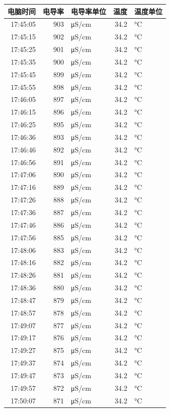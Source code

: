 \documentclass[11pt]{article}
\begin{document}
\begin{enumerate}
\begin{center}
\begin{tabular}{rrlrl}
电脑时间 & 电导率 & 电导率单位 & 温度 & 温度单位\\
\hline
17:45:05 & 903 & μS/cm & 34.2 & °C\\
17:45:15 & 902 & μS/cm & 34.2 & °C\\
17:45:25 & 901 & μS/cm & 34.2 & °C\\
17:45:35 & 900 & μS/cm & 34.2 & °C\\
17:45:45 & 899 & μS/cm & 34.2 & °C\\
17:45:55 & 898 & μS/cm & 34.2 & °C\\
17:46:05 & 897 & μS/cm & 34.2 & °C\\
17:46:15 & 896 & μS/cm & 34.2 & °C\\
17:46:25 & 895 & μS/cm & 34.2 & °C\\
17:46:36 & 893 & μS/cm & 34.2 & °C\\
17:46:46 & 892 & μS/cm & 34.2 & °C\\
17:46:56 & 891 & μS/cm & 34.2 & °C\\
17:47:06 & 890 & μS/cm & 34.2 & °C\\
17:47:16 & 889 & μS/cm & 34.2 & °C\\
17:47:26 & 888 & μS/cm & 34.2 & °C\\
17:47:36 & 887 & μS/cm & 34.2 & °C\\
17:47:46 & 886 & μS/cm & 34.2 & °C\\
17:47:56 & 885 & μS/cm & 34.2 & °C\\
17:48:06 & 883 & μS/cm & 34.2 & °C\\
17:48:16 & 882 & μS/cm & 34.2 & °C\\
17:48:26 & 881 & μS/cm & 34.2 & °C\\
17:48:36 & 880 & μS/cm & 34.2 & °C\\
17:48:47 & 879 & μS/cm & 34.2 & °C\\
17:48:57 & 878 & μS/cm & 34.2 & °C\\
17:49:07 & 877 & μS/cm & 34.2 & °C\\
17:49:17 & 876 & μS/cm & 34.2 & °C\\
17:49:27 & 875 & μS/cm & 34.2 & °C\\
17:49:37 & 874 & μS/cm & 34.2 & °C\\
17:49:47 & 873 & μS/cm & 34.2 & °C\\
17:49:57 & 872 & μS/cm & 34.2 & °C\\
17:50:07 & 871 & μS/cm & 34.2 & °C\\

\end{tabular}
\end{center}
\end{enumerate}
\end{document}
